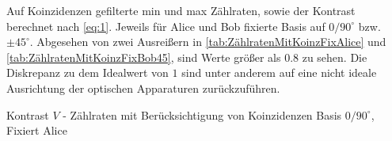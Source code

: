 \documentclass[12pt,a4paper]{article}
\begin{document}
	\begin{table}[H]
	\label{tab:Koinzidenzen}
	\caption{
	Auf Koinzidenzen gefilterte min und max Zählraten, sowie der Kontrast berechnet nach \ref{eq:1}.
	Jeweils für Alice und Bob fixierte Basis auf \(0/90^\circ\) bzw. \(\pm 45^\circ\).
	Abgesehen von zwei Ausreißern in \ref{tab:ZählratenMitKoinzFixAlice} und \ref{tab:ZählratenMitKoinzFixBob45}, sind Werte größer
	als 0.8 zu sehen. Die Diskrepanz zu dem Idealwert von \(1\) sind unter anderem auf eine nicht
	ideale Ausrichtung der optischen Apparaturen zurückzuführen.
	}
	\centering
		\begin{subtable}[b]{0.45\textwidth}
    		\caption{Kontrast \(V\) - Zählraten mit Berücksichtigung von Koinzidenzen Basis \(0/90^\circ\), Fixiert Alice}\label{tab:ZählratenMitKoinzFixAlice}
    		\begin{center}
    		\end{center}
    	\end{subtable}
		\hfill
		\begin{subtable}[b]{0.45\textwidth}
          		\caption{Kontrast \(V\) - Zählraten mit Berücksichtigung von Koinzidenzen Basis \(0/90^\circ\), Fixiert Bob}\label{tab:ZählratenMitKoinzFixBob90}
          		\begin{center}
\end{center}
\end{subtable}
\end{table}
\end{document}
